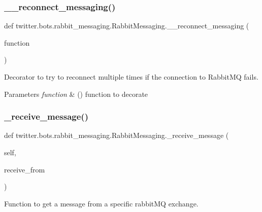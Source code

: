 \subsubsection{\texorpdfstring{\+\_\+\+\_\+reconnect\+\_\+messaging()}{\_\_reconnect\_messaging()}}
{\footnotesize\ttfamily def twitter.\+bots.\+rabbit\+\_\+messaging.\+Rabbit\+Messaging.\+\_\+\+\_\+reconnect\+\_\+messaging (\begin{DoxyParamCaption}\item[{}]{function }\end{DoxyParamCaption})\hspace{0.3cm}{\ttfamily [private]}}



Decorator to try to reconnect multiple times if the connection to Rabbit\+MQ fails. 


\begin{DoxyParams}{Parameters}
{\em function} & () function to decorate \\
\hline
\end{DoxyParams}
\mbox{\label{classtwitter_1_1bots_1_1rabbit__messaging_1_1RabbitMessaging_a9c1185869b76c0f456bda928697fec04}} 
\subsubsection{\texorpdfstring{\+\_\+receive\+\_\+message()}{\_receive\_message()}}
{\footnotesize\ttfamily def twitter.\+bots.\+rabbit\+\_\+messaging.\+Rabbit\+Messaging.\+\_\+receive\+\_\+message (\begin{DoxyParamCaption}\item[{}]{self,  }\item[{}]{receive\+\_\+from }\end{DoxyParamCaption})\hspace{0.3cm}{\ttfamily [private]}}



Function to get a message from a specific rabbit\+MQ exchange. 


